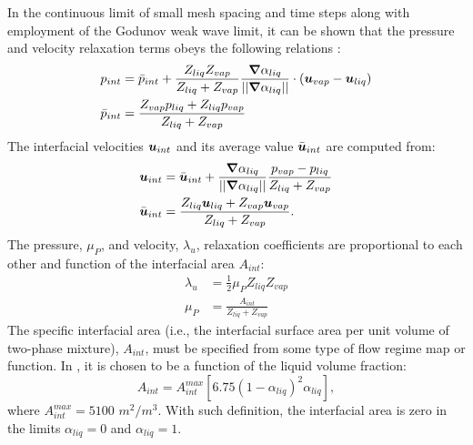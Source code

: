 In the continuous limit of small mesh spacing and time steps along with employment of the Godunov weak wave limit, it can be shown that the pressure and velocity relaxation terms obeys the following relations \cite{Berry_2008b, Chinnayya_2004}:
%
\begin{align}
  \label{E-R:83}
  p_{int} &= \bar{p}_{int} + \frac{Z_{liq}Z_{vap}}{Z_{liq}+Z_{vap}} \frac{\boldsymbol{\nabla} \alpha_{liq}}{|| \boldsymbol{\nabla} \alpha_{liq} ||} \cdot (\boldsymbol u_{vap}-\boldsymbol u_{liq})
  \\
  \bar{p}_{int} &= \frac{Z_{vap}p_{liq}+Z_{liq}p_{vap}}{Z_{liq}+Z_{vap}}
\end{align}
%
The interfacial velocities $\boldsymbol u_{int}$ and its average value $\bar{\boldsymbol u}_{int}$ are computed from:
%
\begin{align}
  \label{E-R:84}
  \boldsymbol u_{int} &= \bar{\boldsymbol u}_{int} +  \frac{\boldsymbol{\nabla} \alpha_{liq}}{|| \boldsymbol{\nabla} \alpha_{liq} ||} \frac{p_{vap}-p_{liq}}{Z_{liq}+Z_{vap}}
  \\
  \bar{\boldsymbol u}_{int} &= \frac{Z_{liq} \boldsymbol u_{liq}+Z_{vap}\boldsymbol u_{vap}}{Z_{liq}+Z_{vap}}.
\end{align}
%
The pressure, $\mu_P$, and velocity, $\lambda_u$, relaxation coefficients are proportional to each other and function of the interfacial area $A_{int}$:
%
\begin{align}
  \label{E-R:85}
  \lambda_u &= \frac{1}{2} \mu_P Z_{liq} Z_{vap}
  \\
  \label{E-R:86}
  \mu_P &= \frac{A_{int}}{Z_{liq}+Z_{vap}}
\end{align}
The specific interfacial area (i.e., the interfacial surface area per unit
volume of two-phase mixture), $A_{int}$, must be specified from some type of
flow regime map or function. In \cite{SEM}, it is chosen to be a function of the liquid volume fraction:
%
\begin{equation}\label{eq:Aint-sect4}
A_{int} = A_{int}^{max} \left[ 6.75 \left(1-\alpha_{liq} \right)^2 \alpha_{liq} \right],
\end{equation}
% 
 
where $A_{int}^{max} = 5100$ $m^2 / m^3$. With such definition, the interfacial area is zero in the limits $\alpha_{liq} = 0$ and $\alpha_{liq} = 1$. 
